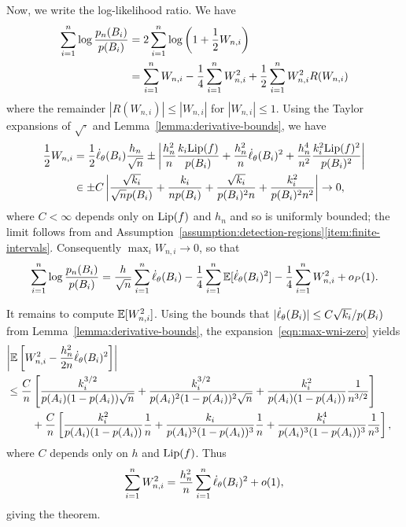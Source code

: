 Now, we write the log-likelihood ratio. We have
\begin{align*}
  \sum_{i = 1}^n \log \frac{p_n(B_i)}{p(B_i)}
  & = 2 \sum_{i = 1}^n \log\left(1 + \frac{1}{2} W_{n,i}\right) \\
  & = \sum_{i = 1}^n W_{n,i}
  - \frac{1}{4} \sum_{i = 1}^n W_{n,i}^2
  + \frac{1}{2} \sum_{i = 1}^n W_{n,i}^2 R(W_{n,i})
\end{align*}
where the remainder $|R(W_{n,i})| \le |W_{n,i}|$ for $|W_{n,i}| \le 1$.
Using the Taylor expansions of $\sqrt{\cdot}$ and
Lemma~\ref{lemma:derivative-bounds}, we have
\begin{align}
  \nonumber
  \frac{1}{2} W_{n,i}
  & = \frac{1}{2} \dot{\ell}_\theta(B_i)
  \frac{h_n}{\sqrt{n}}
  \pm \left|\frac{h_n^2}{n} \frac{k_i {\rm \textup{Lip}}(f)}{p(B_i)}
  + \frac{h_n^2}{n} \dot{\ell}_\theta(B_i)^2
  + \frac{ h_n^4}{n^2} \frac{k_i^2 {\rm \textup{Lip}}(f)^2}{p(B_i)^2}\right| \\
  & \in \pm
  C \left|\frac{\sqrt{k_i}}{\sqrt{n} p(B_i)}
  + \frac{k_i}{n p(B_i)}
  + \frac{\sqrt{k_i}}{p(B_i)^2 n}
  + \frac{k_i^2}{p(B_i)^2 n^2}
  \right| \to 0,
  \label{eqn:max-wni-zero}
\end{align}
where $C < \infty$ depends only on ${\rm \textup{Lip}}(f)$ and $h_n$ and so is
uniformly bounded;
the limit follows from
and Assumption~\ref{assumption:detection-regions}\eqref{item:finite-intervals}.
Consequently $\max_i W_{n,i} \to 0$, so that
\begin{equation}
  \label{eqn:almost-at-the-end}
  \sum_{i = 1}^n \log \frac{p_n(B_i)}{p(B_i)}
  = \frac{h}{\sqrt{n}} \sum_{i = 1}^n \dot{\ell}_\theta(B_i)
  - \frac{1}{4} \sum_{i = 1}^n \mathbb{E}[\dot{\ell}_\theta(B_i)^2]
  - \frac{1}{4} \sum_{i = 1}^n W_{n,i}^2 + o_P(1).
\end{equation}

It remains to compute $\mathbb{E}[W_{n,i}^2]$. Using the bounds
that $|\dot{\ell}_\theta(B_i)| \le C \sqrt{k_i} / p(B_i)$ from
Lemma~\ref{lemma:derivative-bounds},
the
expansion~\eqref{eqn:max-wni-zero}
yields
\begin{align*}
  \lefteqn{\left|\E\left[W_{n,i}^2 - \frac{h_n^2}{2n} \score_\theta(B_i)^2\right]
    \right|} \\
  &
  \le \frac{C}{n} \left[
    \frac{k_i^{3/2}}{p(A_i)(1 - p(A_i)) \sqrt{n}}
    + \frac{k_i^{3/2}}{p(A_i)^2 (1 - p(A_i))^2 \sqrt{n}}
    + \frac{k_i^2}{p(A_i)(1 - p(A_i))} \frac{1}{n^{3/2}}
    \right] \\
  & \qquad ~ +
  \frac{C}{n}
  \left[\frac{k_i^2}{p(A_i)(1 - p(A_i))} \frac{1}{n}
    + \frac{k_i}{p(A_i)^3(1 - p(A_i))^3} \frac{1}{n}
    + \frac{k_i^4}{p(A_i)^3 (1 - p(A_i))^3} \frac{1}{n^3} \right],
\end{align*}
where $C$ depends only on $h$ and ${\rm \textup{Lip}}(f)$.
Thus
\begin{equation*}
  \sum_{i = 1}^n W_{n,i}^2
  = \frac{h_n^2}{n} \sum_{i = 1}^n \dot{\ell}_\theta(B_i)^2
  + o(1),
\end{equation*}
giving the theorem.

